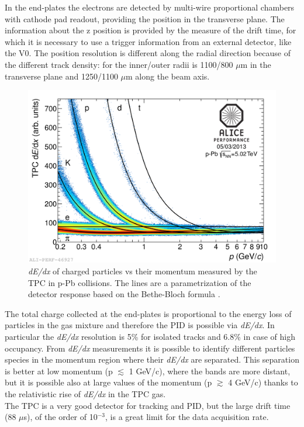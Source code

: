 In the end-plates the electrons are detected by multi-wire proportional chambers with cathode pad readout, providing the position in the transverse plane. The information about the z position is provided by the measure of the drift time, for which it is necessary to use a trigger information from an external detector, like the V0. The position resolution is different  along the radial direction because of the different track density: for the inner/outer radii is 1100/800 $\mu$m in the transverse plane and 1250/1100 $\mu$m along the beam axis.
%
\begin{figure}
  \centering
  \includegraphics[scale=0.15]{figures/TPC_Perf.png}
  \caption{\textit{dE/dx} of charged particles vs their momentum measured by the TPC in p-Pb collisions. The lines are a parametrization of the detector response based on the Bethe-Bloch formula \cite{alice2014performance}.}
  \label{fig:TPC_Perf}
\end{figure}
%
The total charge collected at the end-plates is proportional to the energy loss of particles in the gas mixture and therefore the PID is possible via \textit{dE/dx}. In particular the \textit{dE/dx} resolution is 5\% for isolated tracks and 6.8\% in case of high occupancy. From \textit{dE/dx} measurements it is possible to identify different particles species in the momentum region where their \textit{dE/dx} are separated. This separation is better at low momentum (p $\lesssim$ 1 GeV/c), where the bands are more distant, but it is possible also at large values of the momentum (p $\gtrsim$ 4 GeV/c) thanks to the relativistic rise of \textit{dE/dx} in the TPC gas.\\
The TPC is a very good detector for tracking and PID, but the large drift time (88 $\mu$s), of the order of 10$^{-3}$, is a great limit for the data acquisition rate.\\
